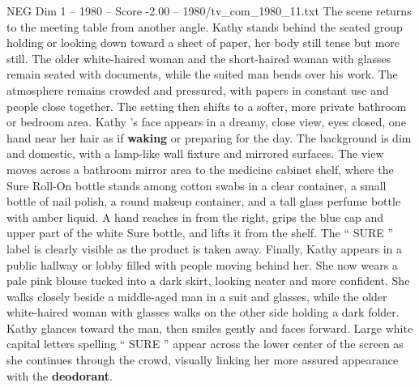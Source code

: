 \begin{textsample}{NEG Dim 1 – 1980 – Score -2.00 – 1980/tv\_com\_1980\_11.txt}
The scene returns to the meeting table from another angle.
Kathy stands behind the seated group holding or looking down toward a sheet of paper, her body still tense but more still.
The older white-haired woman and the short-haired woman with glasses remain seated with documents, while the suited man bends over his work.
The atmosphere remains crowded and pressured, with papers in constant use and people close together.
The setting then shifts to a softer, more private bathroom or bedroom area.
Kathy ’s face appears in a dreamy, close view, eyes closed, one hand near her hair as if \textbf{waking} or preparing for the day.
The background is dim and domestic, with a lamp-like wall fixture and mirrored surfaces.
The view moves across a bathroom mirror area to the medicine cabinet shelf, where the Sure Roll-On bottle stands among cotton swabs in a clear container, a small bottle of nail polish, a round makeup container, and a tall glass perfume bottle with amber liquid.
A hand reaches in from the right, grips the blue cap and upper part of the white Sure bottle, and lifts it from the shelf.
The “ SURE ” label is clearly visible as the product is taken away.
Finally, Kathy appears in a public hallway or lobby filled with people moving behind her.
She now wears a pale pink blouse tucked into a dark skirt, looking neater and more confident.
She walks closely beside a middle-aged man in a suit and glasses, while the older white-haired woman with glasses walks on the other side holding a dark folder.
Kathy glances toward the man, then smiles gently and faces forward.
Large white capital letters spelling “ SURE ” appear across the lower center of the screen as she continues through the crowd, visually linking her more assured appearance with the \textbf{deodorant}.

\end{textsample}

